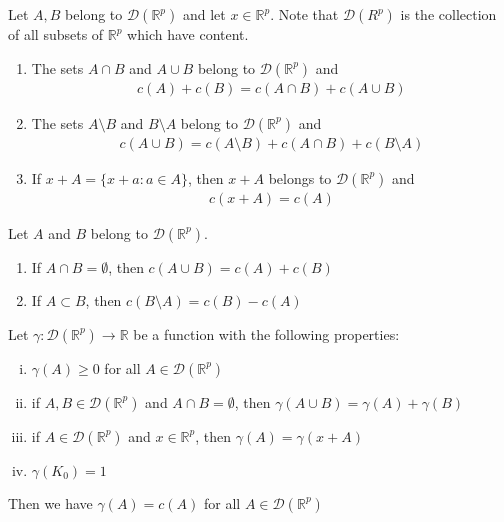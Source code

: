 \documentclass[12pt]{article}
\newcommand{\R}{\mathbb{R}}
\newenvironment{theorem}[2][Theorem]{\begin{trivlist}
\item[\hskip \labelsep {\bfseries #1}\hskip \labelsep {\bfseries #2.}]}{\end{trivlist}}
\newenvironment{corollary}[2][Corollary]{\begin{trivlist}
\item[\hskip \labelsep {\bfseries #1}\hskip \labelsep {\bfseries #2.}]}{\end{trivlist}}
\begin{document}
\begin{theorem}{44.4}
Let $A, B$ belong to $\mathscr{D}(\R^p)$ and let $x \in \R^p$. Note that $\mathscr{D}(R^p)$ is the collection of all subsets of $\R^p$ which have content.
\begin{enumerate}[label=\alph*)]
\item The sets $A \cap B$ and $A \cup B$ belong to $\mathscr{D}(\R^p)$ and 
\begin{align*}
c(A) + c(B) = c(A \cap B) + c(A \cup B)
\end{align*}
\item The sets $A \setminus B$ and $B \setminus A$ belong to $\mathscr{D}(\R^p)$ and
\begin{align*}
c(A \cup B) = c(A \setminus B) + c(A \cap B) + c(B \setminus A)
\end{align*}
\item If $x + A = \{x + a: a \in A\}$, then $x + A$ belongs to $\mathscr{D}(\R^p)$ and
\begin{align*}
c(x + A) = c(A)
\end{align*}
\end{enumerate}
\end{theorem}

\begin{corollary}{44.5}
Let $A$ and $B$ belong to $\mathscr{D}(\R^p)$.
\begin{enumerate}[label=\alph*)]
\item If $A \cap B = \emptyset$, then $c(A \cup B) = c(A) + c(B)$
\item If $A \subset B$, then $c(B \setminus A) = c(B) - c(A)$
\end{enumerate}
\end{corollary}

\begin{theorem}{44.6}
Let $\gamma: \mathscr{D}(\R^p) \to \R$ be a function with the following properties:
\begin{enumerate}[(i)]
\item $\gamma(A) \geq 0$ for all $A \in \mathscr{D}(\R^p)$
\item if $A, B \in \mathscr{D}(\R^p)$ and $A \cap B = \emptyset$, then $\gamma(A \cup B) = \gamma(A) + \gamma(B)$
\item if $A \in \mathscr{D}(\R^p)$ and $x \in \R^p$, then $\gamma(A) = \gamma(x+A)$
\item $\gamma(K_0) = 1$
\end{enumerate}

Then we have $\gamma(A) = c(A)$ for all $A \in \mathscr{D}(\R^p)$
\end{theorem}
\end{document}
